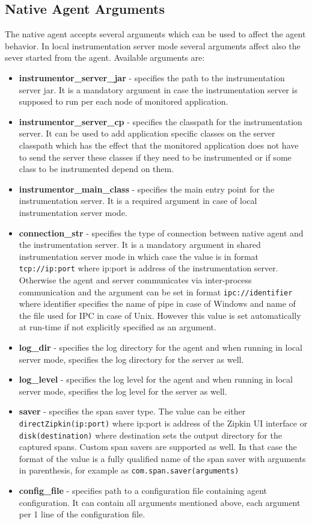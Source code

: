 \subsection{Native Agent Arguments}
The native agent accepts several arguments which can be used to affect the agent behavior. In local instrumentation server mode several arguments affect also the sever started from the agent. Available arguments are:
\begin{itemize}
	\item \textbf{instrumentor\_server\_jar} - specifies the path to the instrumentation server jar. It is a mandatory argument in case the instrumentation server is supposed to run per each node of monitored application.
	\item \textbf{instrumentor\_server\_cp} - specifies the classpath for the instrumentation server. It can be used to add application specific classes on the server classpath which has the effect that the monitored application does not have to send the server these classes if they need to be instrumented or if some class to be instrumented depend on them.
	\item \textbf{instrumentor\_main\_class} - specifies the main entry point for the instrumentation server. It is a required argument in case of local instrumentation server mode.
	\item \textbf{connection\_str} - specifies the type of connection between native agent and the instrumentation server. It is a mandatory argument in shared instrumentation server mode in which case the value is in format \texttt{tcp://ip:port} where ip:port is address of the instrumentation server. Otherwise the agent and server communicates via inter-process communication and the argument can be set in format \texttt{ipc://identifier} where identifier specifies the name of pipe in case of Windows and name of the file used for IPC in case of Unix. However this value is set automatically at run-time if not explicitly specified as an argument.
	\item \textbf{log\_dir} - specifies the log directory for the agent and when running in local server mode, specifies the log directory for the server as well.
	\item \textbf{log\_level} - specifies the log level for the agent and when running in local server mode, specifies the log level for the server as well.
	\item \textbf{saver} - specifies the span saver type. The value can be either \texttt{directZipkin(ip:port)} where ip:port is address of the Zipkin UI interface or \texttt{disk(destination)} where destination sets the output directory for the captured spans. Custom span savers are supported as well. In that case the format of the value is a fully qualified name of the span saver with arguments in parenthesis, for example as \texttt{com.span.saver(arguments)}
	\item \textbf{config\_file} - specifies path to a configuration file containing agent configuration. It can contain all arguments mentioned above, each argument per 1 line of the configuration file.
\end{itemize}

